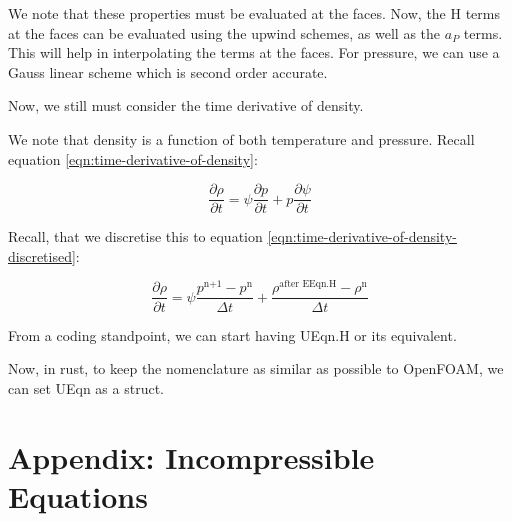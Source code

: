 \documentclass[masters]{ucbthesis}
\renewcommand{\_}{\kern-1.5pt\textunderscore\kern-1.5pt}
\begin{document}
We note that these properties must be evaluated at the faces. 
Now, the H terms at the faces 
can be evaluated using the upwind schemes, as well as 
the $a_P$ terms. This will help in interpolating the terms at the faces.
For pressure, we can use a Gauss linear scheme which is second order 
accurate.

Now, we still must consider the time derivative of density.

We note that density is a function of both temperature and pressure.
Recall equation \ref{eqn:time-derivative-of-density}:

\begin{equation*} 
	\frac{\partial \rho}{\partial t} = \psi \frac{\partial p}{\partial t} 
	+ p \frac{\partial \psi}{\partial t}
\end{equation*}

Recall, that we discretise this to equation
\ref{eqn:time-derivative-of-density-discretised}:

\begin{equation*} 
	\frac{\partial \rho}{\partial t} = \psi 
	\frac{p^\text{n+1} - p^\text{n}}{\Delta t} 
	+ \frac{\rho^{\text{after EEqn.H}} - \rho^\text{n}}{\Delta t}
\end{equation*}

From a coding standpoint, we can start having UEqn.H or its equivalent.

Now, in rust, to keep the nomenclature as similar as possible to OpenFOAM,
we can set UEqn as a struct.

%
%
%


\part{Appendix: Incompressible Equations}
\end{document}
